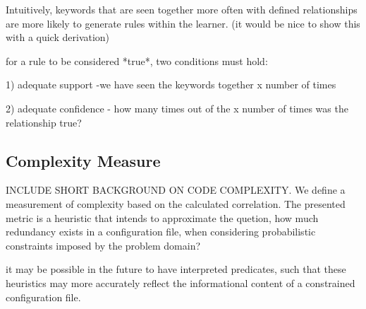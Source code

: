 Intuitively, keywords that are seen together more often with defined relationships are more likely to generate rules within the learner.
 (it would be nice to show this with a quick derivation)

for a rule to be considered *true*, two conditions must hold:

1) adequate support -we have seen the keywords together x number of times

2) adequate confidence - how many times out of the x number of times was the relationship true?

\iffalse
- Open Questions
> What is the difference between {\it important} rules and
  {\it rules we are more sure about}?

> Why doesn't everything just sum to zero?

\fi
\subsection{Complexity Measure}

INCLUDE SHORT BACKGROUND ON CODE COMPLEXITY. We define a measurement
of complexity based on the calculated correlation. The presented
metric is a heuristic that intends to approximate the quetion, 
 how much redundancy exists in a configuration file, when considering
probabilistic constraints imposed by the problem domain?

it may be possible in the future to have interpreted predicates,
such that these heuristics may more accurately reflect the informational
content of a constrained configuration file.




